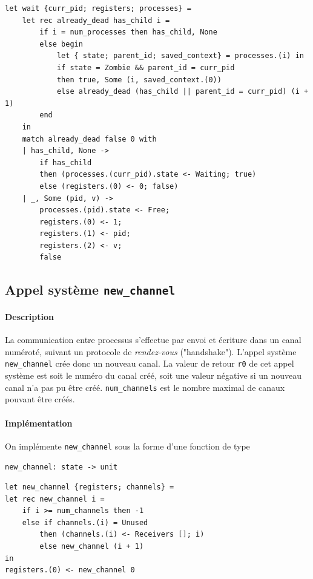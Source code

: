 \documentclass[french, toc]{../cs-classes/cs-classes}
\begin{document}
\begin{verbatim}
let wait {curr_pid; registers; processes} =
    let rec already_dead has_child i =
        if i = num_processes then has_child, None
        else begin
            let { state; parent_id; saved_context} = processes.(i) in
            if state = Zombie && parent_id = curr_pid
            then true, Some (i, saved_context.(0))
            else already_dead (has_child || parent_id = curr_pid) (i + 1)
        end
    in
    match already_dead false 0 with
    | has_child, None ->
        if has_child
        then (processes.(curr_pid).state <- Waiting; true)
        else (registers.(0) <- 0; false)
    | _, Some (pid, v) ->
        processes.(pid).state <- Free;
        registers.(0) <- 1;
        registers.(1) <- pid;
        registers.(2) <- v;
        false
\end{verbatim}

\subsection{Appel système \texttt{new\_channel}}
\paragraph*{Description} 
La communication entre processus s’effectue par envoi et écriture dans un canal numéroté, suivant un protocole de \emph{rendez-vous} ("handshake"). L'appel système \texttt{new\_channel} crée donc un nouveau canal. La valeur de retour \texttt{r0} de cet appel système est soit le numéro du canal créé, soit une valeur négative si un nouveau canal n'a pas pu être créé. \texttt{num\_channels} est le nombre maximal de canaux pouvant être créés.

\paragraph*{Implémentation} On implémente \texttt{new\_channel} sous la forme d'une fonction de type
\begin{center}
    \texttt{new\_channel: state -> unit}
\end{center}

\begin{verbatim}
let new_channel {registers; channels} =
let rec new_channel i =
    if i >= num_channels then -1
    else if channels.(i) = Unused
        then (channels.(i) <- Receivers []; i)
        else new_channel (i + 1)
in
registers.(0) <- new_channel 0
\end{verbatim}
\end{document}
